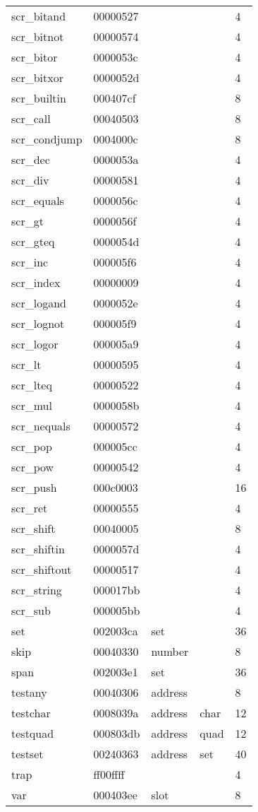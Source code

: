 \begin{center}
\begin{longtable}{lllll}
scr\_bitand & 00000527 &  &   & 4 \\
scr\_bitnot & 00000574 &  &   & 4 \\
scr\_bitor & 0000053c &  &   & 4 \\
scr\_bitxor & 0000052d &  &   & 4 \\
scr\_builtin & 000407cf &  &   & 8 \\
scr\_call & 00040503 &  &   & 8 \\
scr\_condjump & 0004000c &  &   & 8 \\
scr\_dec & 0000053a &  &   & 4 \\
scr\_div & 00000581 &  &   & 4 \\
scr\_equals & 0000056c &  &   & 4 \\
scr\_gt & 0000056f &  &   & 4 \\
scr\_gteq & 0000054d &  &   & 4 \\
scr\_inc & 000005f6 &  &   & 4 \\
scr\_index & 00000009 &  &   & 4 \\
scr\_logand & 0000052e &  &   & 4 \\
scr\_lognot & 000005f9 &  &   & 4 \\
scr\_logor & 000005a9 &  &   & 4 \\
scr\_lt & 00000595 &  &   & 4 \\
scr\_lteq & 00000522 &  &   & 4 \\
scr\_mul & 0000058b &  &   & 4 \\
scr\_nequals & 00000572 &  &   & 4 \\
scr\_pop & 000005cc &  &   & 4 \\
scr\_pow & 00000542 &  &   & 4 \\
scr\_push & 000c0003 &  &   & 16 \\
scr\_ret & 00000555 &  &   & 4 \\
scr\_shift & 00040005 &  &   & 8 \\
scr\_shiftin & 0000057d &  &   & 4 \\
scr\_shiftout & 00000517 &  &   & 4 \\
scr\_string & 000017bb &  &   & 4 \\
scr\_sub & 000005bb &  &   & 4 \\
set & 002003ca & set &   & 36 \\
skip & 00040330 & number &   & 8 \\
span & 002003e1 & set &   & 36 \\
testany & 00040306 & address &   & 8 \\
testchar & 0008039a & address & char  & 12 \\
testquad & 000803db & address & quad  & 12 \\
testset & 00240363 & address & set  & 40 \\
trap & ff00ffff &  &   & 4 \\
var & 000403ee & slot &   & 8 \\
\end{longtable}
\end{center}
